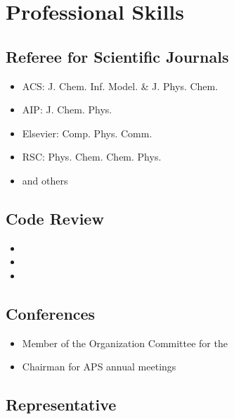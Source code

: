 \documentclass{article}
\begin{document}
\section*{Professional Skills}

\subsection*{Referee for Scientific Journals}

\begin{itemize}
\setlength{\itemsep}{0pt}
\setlength{\parskip}{0pt}
\setlength{\parsep}{0pt}
\item ACS: J. Chem. Inf. Model. \& J. Phys. Chem.
\item AIP: J. Chem. Phys.
\item Elsevier: Comp. Phys. Comm.
\item RSC: Phys. Chem. Chem. Phys.
\item and others
\end{itemize}

\subsection*{Code Review}

\begin{itemize}
\setlength{\itemsep}{0pt}
\setlength{\parskip}{0pt}
\setlength{\parsep}{0pt}
\item {}
\item {}
\item {}
\end{itemize}

\subsection*{Conferences}

\begin{itemize}
\setlength{\itemsep}{0pt}
\setlength{\parskip}{0pt}
\setlength{\parsep}{0pt}
\item Member of the Organization Committee for the 
\item Chairman for APS annual meetings
\end{itemize}

\subsection*{Representative}
\end{document}
